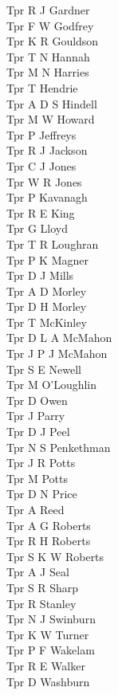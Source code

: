 \begin{multicols}{4}
  Tpr R J Gardner \\
  Tpr F W Godfrey \\
  Tpr K R Gouldson \\
  Tpr T N Hannah \\
  Tpr M N Harries \\
  Tpr T Hendrie \\
  Tpr A D S Hindell \\
  Tpr M W Howard \\
  Tpr P Jeffreys \\
  Tpr R J Jackson \\
  Tpr C J Jones \\
  Tpr W R Jones \\
  Tpr P Kavanagh \\
  Tpr R E King \\
  Tpr G Lloyd \\
  Tpr T R Loughran \\
  Tpr P K Magner \\
  Tpr D J Mills \\
  Tpr A D Morley \\
  Tpr D H Morley \\
  Tpr T McKinley \\
  Tpr D L A McMahon \\
  Tpr J P J McMahon \\
  Tpr S E Newell \\
  Tpr M O'Loughlin \\
  Tpr D Owen \\
  Tpr J Parry \\
  Tpr D J Peel \\
  Tpr N S Penkethman \\
  Tpr J R Potts \\
  Tpr M Potts \\
  Tpr D N Price \\
  Tpr A Reed \\
  Tpr A G Roberts \\
  Tpr R H Roberts \\
  Tpr S K W Roberts \\
  Tpr A J Seal \\
  Tpr S R Sharp \\
  Tpr R Stanley \\
  Tpr N J Swinburn \\
  Tpr K W Turner \\
  Tpr P F Wakelam \\
  Tpr R E Walker \\
  Tpr D Washburn \\

\end{multicols}
